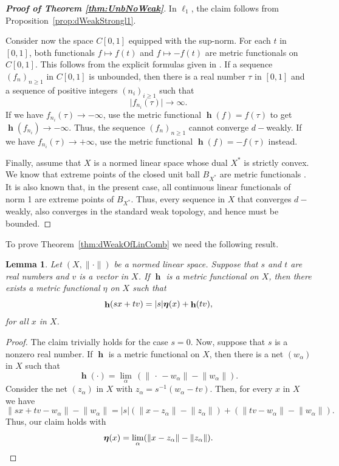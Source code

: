 \documentclass[a4paper,12pt]{article}
\newtheorem{lem}[thm]{Lemma}
\theoremstyle{definition}
\DeclareMathOperator{\h}{\mathbf{h}}
\newcommand{\abs}[1]{\lvert#1\rvert}
\newcommand{\norm}[1]{\lVert#1\rVert}
\numberwithin{equation}{section}
\begin{document}
\begin{proof}[\bf Proof of Theorem \ref{thm:UnbNoWeak}]
In $\ell_1$, the claim follows from Proposition~\ref{prop:dWeakStrongl1}.

Consider now the space $C[0,1]$ equipped with the sup-norm. For each $t$ in 
$[0,1]$, both functionals $f\mapsto f(t)$ and $f\mapsto -f(t)$ are metric 
functionals on $C[0,1]$. This follows from the explicit formulas given in 
\cite[Theorem~5.1]{Walsh2018}. If a sequence $(f_n)_{n\geq 1}$ in $C[0,1]$ is 
unbounded, then there is a real number $\tau$ in $[0,1]$ and a sequence of 
positive integers $(n_i)_{i\geq 1}$ such that
$$
	\abs{f_{n_i}(\tau)} \rightarrow \infty.
$$
If we have $f_{n_i}(\tau) \rightarrow -\infty $, use the metric functional 
$\h(f)=f(\tau)$ to get $\h(f_{n_i})\rightarrow -\infty$. Thus, the sequence
$(f_n)_{n\geq 1}$ cannot converge $d-$weakly. If we have 
$f_{n_i}(\tau) \rightarrow +\infty $, use the metric functional $\h(f)=-f(\tau)$
instead.

Finally, assume that $X$ is a normed linear space whose dual $X^*$ is
strictly convex. We know that extreme points of the closed unit ball $B_{X^*}$
are metric functionals \cite[Corollary 3.5]{Walsh2018}. It is also known that,
in the present case, all continuous linear functionals of norm 1 are extreme points
of $B_{X^*}$. Thus, every sequence in $X$ that converges $d-$weakly, also converges  
in the standard weak topology, and hence must be bounded. 
\end{proof}

To prove Theorem~\ref{thm:dWeakOfLinComb} we need the following result.

\begin{lem}\label{lem:MFcomb}
Let $(X,\norm{\cdot})$ be a normed linear space. Suppose that $s$ and $t$ are
real numbers and $v$ is a vector in $X$. If $\h$ is a metric functional on $X$,
then there exists a metric functional {\boldmath$\eta$} on $X$ such that 
$$
	\h(sx + tv) = \abs{s}\mbox{\boldmath$\eta$}(x) + \h(tv),
$$
for all $x$ in $X$.
\end{lem} 

\begin{proof}
The claim trivially holds for the case $s=0$. Now, suppose that $s$ is a nonzero 
real number. If $\h$ is a metric functional on $X$, then there is a net 
$(w_\alpha)$ in $X$ such that
$$
	\h(\cdot)= \lim_{\alpha}\, (\norm{\,\cdot\,- w_\alpha} - \norm{w_\alpha}).
$$
Consider the net $(z_\alpha)$ in $X$ with $z_\alpha = s^{-1}(w_\alpha - tv)$. 
Then, for every $x$ in $X$ we have
$$
	\norm{sx + tv - w_\alpha}- \norm{w_\alpha} = \abs{s}(\norm{x - z_\alpha} 
		-\norm{z_\alpha}) + (\norm{tv - w_\alpha} 
		- \norm{w_\alpha}).
$$
Thus, our claim holds with
$$
	\mbox{\boldmath$\eta$}(x) = \lim_{\alpha}(\norm{x - z_\alpha} 
	-\norm{z_\alpha}).
$$
\end{proof}
\end{document}
